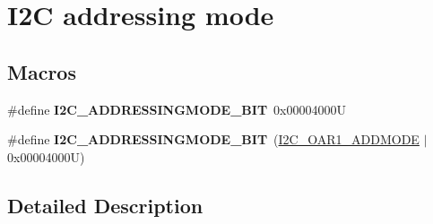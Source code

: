\hypertarget{group___i2_c__addressing__mode}{}\section{I2C addressing mode}
\label{group___i2_c__addressing__mode}
\subsection*{Macros}
\begin{DoxyCompactItemize}
\item 
\mbox{\label{group___i2_c__addressing__mode_ga28cf3b277595ac15edf383c2574ed18d}} 
\#define {\bfseries I2\+C\+\_\+\+A\+D\+D\+R\+E\+S\+S\+I\+N\+G\+M\+O\+D\+E\+\_\+B\+IT}~0x00004000U
\item 
\mbox{\label{group___i2_c__addressing__mode_ga2401dc32e64cd53290497bab73c3608d}} 
\#define {\bfseries I2\+C\+\_\+\+A\+D\+D\+R\+E\+S\+S\+I\+N\+G\+M\+O\+D\+E\+\_\+B\+IT}~(\hyperlink{group___peripheral___registers___bits___definition_ga7d8df80cd27313c896e887aae81fa639}{I2\+C\+\_\+\+O\+A\+R1\+\_\+\+A\+D\+D\+M\+O\+DE} $\vert$ 0x00004000\+U)
\end{DoxyCompactItemize}


\subsection{Detailed Description}
